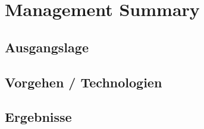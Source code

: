 \section*{Management Summary}

\subsection*{Ausgangslage}


\subsection*{Vorgehen / Technologien}


\subsection*{Ergebnisse}



\newpage